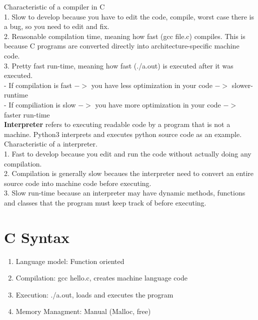 \documentclass{article}
\begin{document}
\noindent Characteristic of a compiler in C \\

1. Slow to develop because you have to edit the code, compile, worst case there is a bug, so you need to edit and fix. \\

2. Reasonable compilation time, meaning how fast (gcc file.c) compiles. This is because C programs are converted directly into architecture-specific machine code. \\

3. Pretty fast run-time, meaning how fast (./a.out) is executed after it was executed. \\

- If compilation is fast $->$ you have less optimization in your code $->$ slower-runtime \\

- If compiliation is slow $->$ you have more optimization in your code $->$ faster run-time \\

\noindent \textbf{Interpreter} refers to executing readable code by a program that is not a machine. Python3 interprets and executes python source code as an example. \\

\noindent Characteristic of a interpreter. \\

1. Fast to develop because you edit and run the code without actually doing any compilation. \\

2. Compilation is generally slow becaues the interpreter need to convert an entire source code into machine code before executing. \\

3. Slow run-time because an interpreter may have dynamic methods, functions and classes that the program must keep track of before executing. \\

\section{C Syntax} 
\begin{enumerate}
\item Language model: Function oriented 
\item Compilation: gcc hello.c, creates machine language code
\item Execution: ./a.out, loads and executes the program
\item Memory Managment: Manual (Malloc, free)
\end{enumerate}
\end{document}
